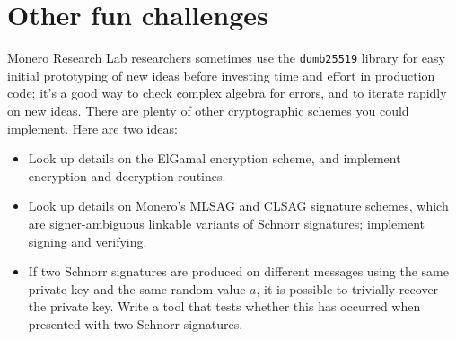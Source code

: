 \documentclass{article}
\begin{document}
\section{Other fun challenges}
Monero Research Lab researchers sometimes use the \texttt{dumb25519} library for easy initial prototyping of new ideas before investing time and effort in production code; it's a good way to check complex algebra for errors, and to iterate rapidly on new ideas. There are plenty of other cryptographic schemes you could implement. Here are two ideas:
\begin{itemize}
\item Look up details on the ElGamal encryption scheme, and implement encryption and decryption routines.
\item Look up details on Monero's MLSAG and CLSAG signature schemes, which are signer-ambiguous linkable variants of Schnorr signatures; implement signing and verifying.
\item If two Schnorr signatures are produced on different messages using the same private key and the same random value $a$, it is possible to trivially recover the private key. Write a tool that tests whether this has occurred when presented with two Schnorr signatures.
\end{itemize}
\end{document}
